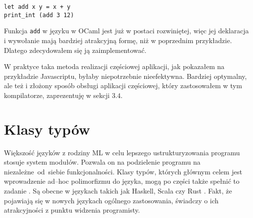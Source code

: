 \documentclass[declaration,shortabstract]{iithesis}
\begin{document}
\begin{lstlisting}[frame=lines]
let add x y = x + y 
print_int (add 3 12)
\end{lstlisting}

Funkcja \texttt{add} w języku w OCaml jest już w postaci rozwiniętej, więc jej 
deklaracja i wywołanie mają bardziej atrakcyjną formę, niż w poprzednim 
przykładzie. Dlatego zdecydowałem się ją zaimplementować.

W praktyce taka metoda realizacji częściowej aplikacji, jak pokazałem na 
przykładzie Javascriptu, byłaby niepotrzebnie nieefektywna. Bardziej optymalny,
ale też i złożony sposób obsługi aplikacji częściowej, który zastosowałem w tym 
kompilatorze, zaprezentuję w sekcji $3.4$.




\section{Klasy typów}
Większość języków z rodziny ML w celu lepszego ustrukturyzowania
programu stosuje system modułów. Pozwala on na podzielenie programu na 
niezależne~od~siebie funkcjonalności.
Klasy typów, których głównym celem jest wprowadzenie 
ad--hoc polimorfizmu do języka, mogą po części także spełnić to zadanie 
\cite{modules_vs_typeclasses}. 
Są obecne w językach takich jak Haskell, Scala\cite{scala_traits} czy Rust
\cite{rust_traits}. Fakt, że pojawiają się
w nowych językach ogólnego zastosowania, świadczy o ich atrakcyjności z punktu 
widzenia programisty. 
\end{document}
